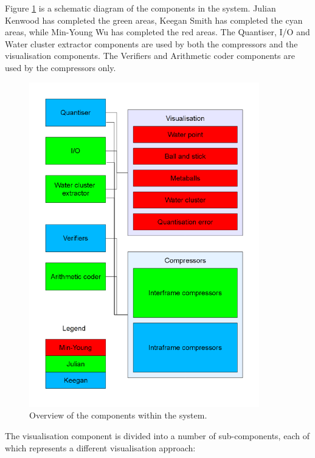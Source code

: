 Figure \ref{fig:design_overview} is a schematic diagram of the components in
the system. Julian Kenwood has completed the green areas, Keegan Smith has
completed the cyan areas, while Min-Young Wu has completed the red areas. The
Quantiser, I/O and Water cluster extractor components are used by both the
compressors and the visualisation components. The Verifiers and Arithmetic
coder components are used by the compressors only.

\begin{figure}
  \begin{center}
    \includegraphics[width=100mm]{breakdown}
  \end{center}
  \caption{Overview of the components within the system.}
  \label{fig:design_overview}
\end{figure}



The visualisation component is divided into a number of sub-components, each of
which represents a different visualisation approach:

